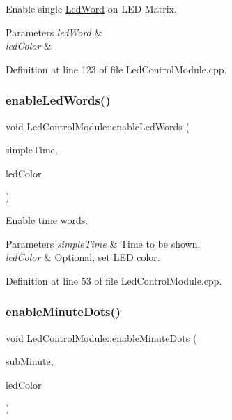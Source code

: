 Enable single \mbox{\hyperlink{class_led_word}{Led\+Word}} on L\+ED Matrix. 
\begin{DoxyParams}{Parameters}
{\em led\+Word} & \\
\hline
{\em led\+Color} & \\
\hline
\end{DoxyParams}


Definition at line 123 of file Led\+Control\+Module.\+cpp.

\mbox{\label{class_led_control_module_ac2e92014634c3cbfbcecff4473f39dac}} 
\subsubsection{\texorpdfstring{enableLedWords()}{enableLedWords()}}
{\footnotesize\ttfamily void Led\+Control\+Module\+::enable\+Led\+Words (\begin{DoxyParamCaption}\item[{const \mbox{\hyperlink{class_simple_time}{Simple\+Time}} \&}]{simple\+Time,  }\item[{const Rgbw\+Color \&}]{led\+Color }\end{DoxyParamCaption})\hspace{0.3cm}{\ttfamily [private]}}

Enable time words. 
\begin{DoxyParams}{Parameters}
{\em simple\+Time} & Time to be shown. \\
\hline
{\em led\+Color} & Optional, set L\+ED color. \\
\hline
\end{DoxyParams}


Definition at line 53 of file Led\+Control\+Module.\+cpp.

\mbox{\label{class_led_control_module_a6c8c6fcd7dc688fb8c14933f418488ed}} 
\subsubsection{\texorpdfstring{enableMinuteDots()}{enableMinuteDots()}}
{\footnotesize\ttfamily void Led\+Control\+Module\+::enable\+Minute\+Dots (\begin{DoxyParamCaption}\item[{int}]{sub\+Minute,  }\item[{const Rgbw\+Color \&}]{led\+Color }\end{DoxyParamCaption})\hspace{0.3cm}{\ttfamily [private]}}

